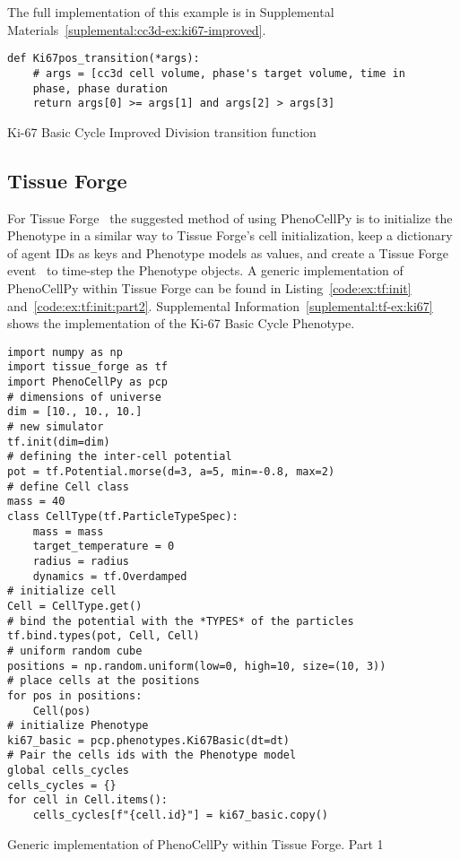 The full implementation of this example is in Supplemental Materials~\ref{suplemental:cc3d-ex:ki67-improved}.

\begin{listing}[!htpb]
\begin{verbatim}
def Ki67pos_transition(*args):
    # args = [cc3d cell volume, phase's target volume, time in 
    phase, phase duration
    return args[0] >= args[1] and args[2] > args[3]
\end{verbatim}
\caption{Ki-67 Basic Cycle Improved Division transition function}\label{code:ex:cc3d:ki67-improved}
\end{listing}

\subsection{Tissue Forge}\label{sec:examples:tf}
For Tissue Forge~\cite{sego_tissue_2022} the suggested method of using PhenoCellPy is to initialize the Phenotype in a similar way to Tissue Forge's cell initialization, keep a dictionary of agent IDs as keys and Phenotype models as values, and create a Tissue Forge event~\cite{sego_tissue_2022} to time-step the Phenotype objects. A generic implementation of PhenoCellPy within Tissue Forge can be found in Listing~\ref{code:ex:tf:init} and~\ref{code:ex:tf:init:part2}. Supplemental Information~\ref{suplemental:tf-ex:ki67} shows the implementation of the Ki-67 Basic Cycle Phenotype.
\begin{listing}[H]
\begin{verbatim}
import numpy as np
import tissue_forge as tf
import PhenoCellPy as pcp
# dimensions of universe
dim = [10., 10., 10.]
# new simulator
tf.init(dim=dim)
# defining the inter-cell potential
pot = tf.Potential.morse(d=3, a=5, min=-0.8, max=2)
# define Cell class
mass = 40
class CellType(tf.ParticleTypeSpec):
    mass = mass
    target_temperature = 0
    radius = radius
    dynamics = tf.Overdamped
# initialize cell
Cell = CellType.get()
# bind the potential with the *TYPES* of the particles
tf.bind.types(pot, Cell, Cell)
# uniform random cube
positions = np.random.uniform(low=0, high=10, size=(10, 3))
# place cells at the positions 
for pos in positions:
    Cell(pos)
# initialize Phenotype
ki67_basic = pcp.phenotypes.Ki67Basic(dt=dt)
# Pair the cells ids with the Phenotype model
global cells_cycles
cells_cycles = {}
for cell in Cell.items():
    cells_cycles[f"{cell.id}"] = ki67_basic.copy()
\end{verbatim}
\caption{Generic implementation of PhenoCellPy within Tissue Forge. Part 1}\label{code:ex:tf:init}
\end{listing}

